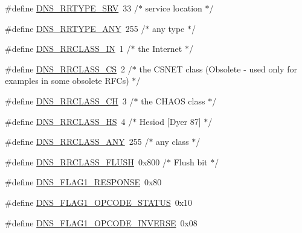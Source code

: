 \begin{DoxyCompactItemize}
\#define \hyperlink{openmote-cc2538_2lwip_2src_2include_2lwip_2prot_2dns_8h_a38f81c327955912ba9cc893c26d3a86e}{D\+N\+S\+\_\+\+R\+R\+T\+Y\+P\+E\+\_\+\+S\+RV}~33    /$\ast$ service location $\ast$/
\item 
\#define \hyperlink{openmote-cc2538_2lwip_2src_2include_2lwip_2prot_2dns_8h_aea32c0d7d57c585bb1a9bfd3ce81bed5}{D\+N\+S\+\_\+\+R\+R\+T\+Y\+P\+E\+\_\+\+A\+NY}~255   /$\ast$ any type $\ast$/
\item 
\#define \hyperlink{openmote-cc2538_2lwip_2src_2include_2lwip_2prot_2dns_8h_a08bc1c1897d2921b6f102365be55da2a}{D\+N\+S\+\_\+\+R\+R\+C\+L\+A\+S\+S\+\_\+\+IN}~1     /$\ast$ the Internet $\ast$/
\item 
\#define \hyperlink{openmote-cc2538_2lwip_2src_2include_2lwip_2prot_2dns_8h_a9d64fb2a8d4b656f11c7b334b810b5f1}{D\+N\+S\+\_\+\+R\+R\+C\+L\+A\+S\+S\+\_\+\+CS}~2     /$\ast$ the C\+S\+N\+ET class (Obsolete -\/ used only for examples in some obsolete R\+F\+Cs) $\ast$/
\item 
\#define \hyperlink{openmote-cc2538_2lwip_2src_2include_2lwip_2prot_2dns_8h_ae403127af0f1656d8c724e723f6b3252}{D\+N\+S\+\_\+\+R\+R\+C\+L\+A\+S\+S\+\_\+\+CH}~3     /$\ast$ the C\+H\+A\+OS class $\ast$/
\item 
\#define \hyperlink{openmote-cc2538_2lwip_2src_2include_2lwip_2prot_2dns_8h_a47055a9391e4a5c03e2aba7b1a4ad39a}{D\+N\+S\+\_\+\+R\+R\+C\+L\+A\+S\+S\+\_\+\+HS}~4     /$\ast$ Hesiod \mbox{[}Dyer 87\mbox{]} $\ast$/
\item 
\#define \hyperlink{openmote-cc2538_2lwip_2src_2include_2lwip_2prot_2dns_8h_a21008b249272ea02cfdc31aa7502a217}{D\+N\+S\+\_\+\+R\+R\+C\+L\+A\+S\+S\+\_\+\+A\+NY}~255   /$\ast$ any class $\ast$/
\item 
\#define \hyperlink{openmote-cc2538_2lwip_2src_2include_2lwip_2prot_2dns_8h_ad8e2e9df5f9942d5f2a50bbfc6da80d3}{D\+N\+S\+\_\+\+R\+R\+C\+L\+A\+S\+S\+\_\+\+F\+L\+U\+SH}~0x800 /$\ast$ Flush bit $\ast$/
\item 
\#define \hyperlink{openmote-cc2538_2lwip_2src_2include_2lwip_2prot_2dns_8h_a96eb4534b574ece96ed36806039f73d3}{D\+N\+S\+\_\+\+F\+L\+A\+G1\+\_\+\+R\+E\+S\+P\+O\+N\+SE}~0x80
\item 
\#define \hyperlink{openmote-cc2538_2lwip_2src_2include_2lwip_2prot_2dns_8h_a4350350ce0d4595876743d4c0a720bcc}{D\+N\+S\+\_\+\+F\+L\+A\+G1\+\_\+\+O\+P\+C\+O\+D\+E\+\_\+\+S\+T\+A\+T\+US}~0x10
\item 
\#define \hyperlink{openmote-cc2538_2lwip_2src_2include_2lwip_2prot_2dns_8h_ae7250008b68d1909d54040515eef8ebb}{D\+N\+S\+\_\+\+F\+L\+A\+G1\+\_\+\+O\+P\+C\+O\+D\+E\+\_\+\+I\+N\+V\+E\+R\+SE}~0x08

\end{DoxyCompactItemize}
